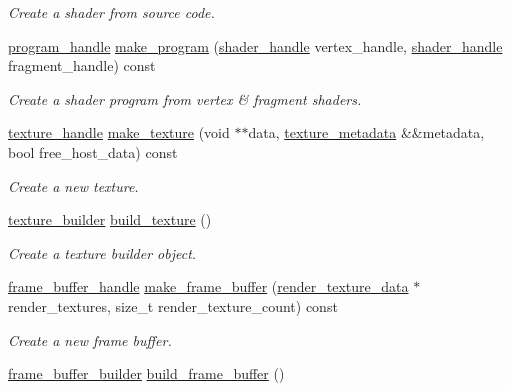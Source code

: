 \begin{DoxyCompactItemize}
\begin{DoxyCompactList}\small\item\em Create a shader from source code. \end{DoxyCompactList}\item 
\mbox{\hyperlink{structmoka_1_1program__handle}{program\+\_\+handle}} \mbox{\hyperlink{classmoka_1_1graphics__device_ac6586c1848a3e60b60e3873f8e666eb6}{make\+\_\+program}} (\mbox{\hyperlink{structmoka_1_1shader__handle}{shader\+\_\+handle}} vertex\+\_\+handle, \mbox{\hyperlink{structmoka_1_1shader__handle}{shader\+\_\+handle}} fragment\+\_\+handle) const
\begin{DoxyCompactList}\small\item\em Create a shader program from vertex \& fragment shaders. \end{DoxyCompactList}\item 
\mbox{\hyperlink{structmoka_1_1texture__handle}{texture\+\_\+handle}} \mbox{\hyperlink{classmoka_1_1graphics__device_afc32983bf80e3af6bf2b20fa3d7721fd}{make\+\_\+texture}} (void $\ast$$\ast$data, \mbox{\hyperlink{structmoka_1_1texture__metadata}{texture\+\_\+metadata}} \&\&metadata, bool free\+\_\+host\+\_\+data) const
\begin{DoxyCompactList}\small\item\em Create a new texture. \end{DoxyCompactList}\item 
\mbox{\hyperlink{classmoka_1_1texture__builder}{texture\+\_\+builder}} \mbox{\hyperlink{classmoka_1_1graphics__device_a67ed8e94298f76d86e04226cf6bccda0}{build\+\_\+texture}} ()
\begin{DoxyCompactList}\small\item\em Create a texture builder object. \end{DoxyCompactList}\item 
\mbox{\hyperlink{structmoka_1_1frame__buffer__handle}{frame\+\_\+buffer\+\_\+handle}} \mbox{\hyperlink{classmoka_1_1graphics__device_ac00cc461a5283777edfe6e49f7948de0}{make\+\_\+frame\+\_\+buffer}} (\mbox{\hyperlink{structmoka_1_1render__texture__data}{render\+\_\+texture\+\_\+data}} $\ast$render\+\_\+textures, size\+\_\+t render\+\_\+texture\+\_\+count) const
\begin{DoxyCompactList}\small\item\em Create a new frame buffer. \end{DoxyCompactList}\item 
\mbox{\hyperlink{structmoka_1_1frame__buffer__builder}{frame\+\_\+buffer\+\_\+builder}} \mbox{\hyperlink{classmoka_1_1graphics__device_a520088ba232098b0b2e6053d1a092542}{build\+\_\+frame\+\_\+buffer}} ()
$$
\end{DoxyCompactItemize}
